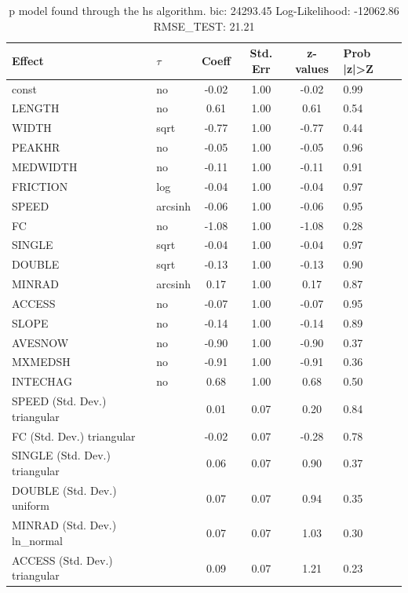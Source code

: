 \begin{table}
	\caption{p model found through the hs algorithm. bic: 24293.45 Log-Likelihood: -12062.86 RMSE_TEST: 21.21}
	\begin{center}
		\begin{tabular}{|l|l|c|c|c|l|}
			\hline
			Effect & $\tau$ & Coeff & Std. Err & z-values & Prob |z|>Z \\
			\hline
			const & no & -0.02 & 1.00 & -0.02 & 0.99 \\
			\hline
			LENGTH & no & 0.61 & 1.00 & 0.61 & 0.54 \\
			\hline
			WIDTH & sqrt & -0.77 & 1.00 & -0.77 & 0.44 \\
			\hline
			PEAKHR & no & -0.05 & 1.00 & -0.05 & 0.96 \\
			\hline
			MEDWIDTH & no & -0.11 & 1.00 & -0.11 & 0.91 \\
			\hline
			FRICTION & log & -0.04 & 1.00 & -0.04 & 0.97 \\
			\hline
			SPEED & arcsinh & -0.06 & 1.00 & -0.06 & 0.95 \\
			\hline
			FC & no & -1.08 & 1.00 & -1.08 & 0.28 \\
			\hline
			SINGLE & sqrt & -0.04 & 1.00 & -0.04 & 0.97 \\
			\hline
			DOUBLE & sqrt & -0.13 & 1.00 & -0.13 & 0.90 \\
			\hline
			MINRAD & arcsinh & 0.17 & 1.00 & 0.17 & 0.87 \\
			\hline
			ACCESS & no & -0.07 & 1.00 & -0.07 & 0.95 \\
			\hline
			SLOPE & no & -0.14 & 1.00 & -0.14 & 0.89 \\
			\hline
			AVESNOW & no & -0.90 & 1.00 & -0.90 & 0.37 \\
			\hline
			MXMEDSH & no & -0.91 & 1.00 & -0.91 & 0.36 \\
			\hline
			INTECHAG & no & 0.68 & 1.00 & 0.68 & 0.50 \\
			\hline
			SPEED (Std. Dev.) triangular &  & 0.01 & 0.07 & 0.20 & 0.84 \\
			\hline
			FC (Std. Dev.) triangular &  & -0.02 & 0.07 & -0.28 & 0.78 \\
			\hline
			SINGLE (Std. Dev.) triangular &  & 0.06 & 0.07 & 0.90 & 0.37 \\
			\hline
			DOUBLE (Std. Dev.) uniform &  & 0.07 & 0.07 & 0.94 & 0.35 \\
			\hline
			MINRAD (Std. Dev.) ln_normal &  & 0.07 & 0.07 & 1.03 & 0.30 \\
			\hline
			ACCESS (Std. Dev.) triangular &  & 0.09 & 0.07 & 1.21 & 0.23 \\

\end{tabular}
\end{center}
\end{table}
